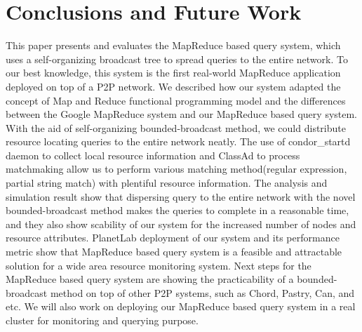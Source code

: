 \documentclass{acm_proc_article-sp}
\begin{document}
\section{Conclusions and Future Work}
This paper presents and evaluates the MapReduce based query system, which uses a self-organizing broadcast tree to spread queries to the entire network.
To our best knowledge, this system is the first real-world MapReduce application deployed on top of a P2P network.
We described how our system adapted the concept of Map and Reduce functional programming model and the differences between the Google MapReduce system and our MapReduce based query system.
With the aid of self-organizing bounded-broadcast method, we could distribute resource locating queries to the entire network neatly. 
The use of condor\_startd daemon to collect local resource information and ClassAd to process matchmaking allow us to perform various matching method(regular expression, partial string match) with plentiful resource information.
The analysis and simulation result show that dispersing query to the entire network with the novel bounded-broadcast method makes the queries to complete in a reasonable time, 
and they also show scability of our system for the increased number of nodes and resource attributes.
PlanetLab deployment of our system and its performance metric show that MapReduce based query system is a feasible and attractable solution for a wide area resource monitoring system.
Next steps for the MapReduce based query system are showing the practicability of a bounded-broadcast method on top of other P2P systems, such as Chord, Pastry, Can, and etc.
We will also work on deploying our MapReduce based query system in a real cluster for monitoring and querying purpose.


\balancecolumns
\end{document}

